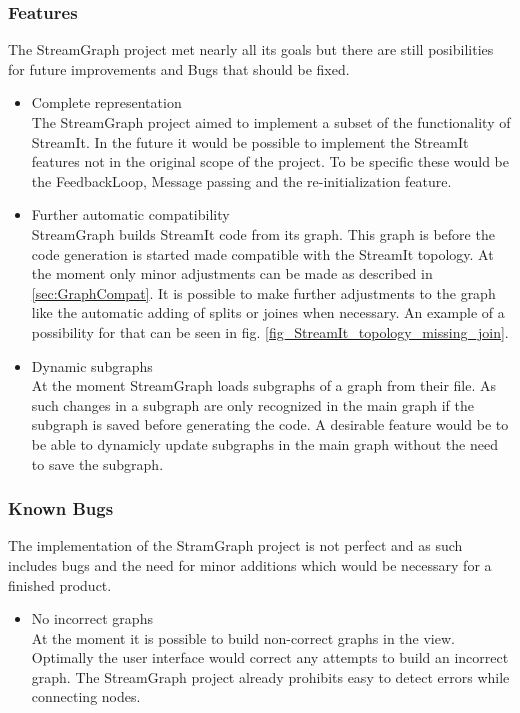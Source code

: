 \documentclass[journal]{IEEEtran}
\begin{document}
\subsubsection{Features}
The StreamGraph project met nearly all its goals but there are still 
posibilities for future improvements and Bugs that should be fixed.
\begin{itemize}

\item Complete representation\\
The StreamGraph project aimed to implement a subset of the functionality 
of StreamIt. In the future it would be possible to implement the StreamIt 
features not in the original scope of the project. To be specific these 
would be the FeedbackLoop, Message passing and the re-initialization feature.\\

\item Further automatic compatibility\\
StreamGraph builds StreamIt code from its graph. This graph is before the 
code generation is started made compatible with the StreamIt topology. At 
the moment only minor adjustments can be made as described in 
\ref{sec:GraphCompat}. It is possible to make further adjustments to the 
graph like the automatic adding of splits or joines when necessary. An 
example of a possibility for that can be seen in fig. 
\ref{fig_StreamIt_topology_missing_join}.

\item Dynamic subgraphs\\
At the moment StreamGraph loads subgraphs of a graph from their file. As such 
changes in a subgraph are only recognized in the main graph if the subgraph 
is saved before generating the code. A desirable feature would be to be able 
to dynamicly update subgraphs in the main graph without the need to save the 
subgraph.
\end{itemize}

\subsubsection{Known Bugs}
The implementation of the StramGraph project is not perfect and as such includes
bugs and the need for minor additions which would be necessary for a finished product.
\begin{itemize}

\item No incorrect graphs\\
At the moment it is possible to build non-correct graphs in the view. Optimally the 
user interface would correct any attempts to build an incorrect graph. The StreamGraph 
project already prohibits easy to detect errors while connecting nodes.

\end{itemize}
\end{document}
